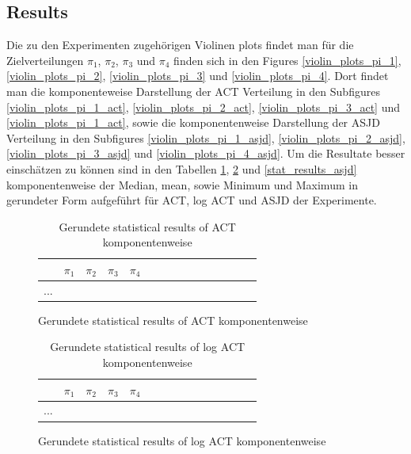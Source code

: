 \documentclass{scrartcl}
\begin{document}
    \subsection{Results}
    Die zu den Experimenten zugehörigen Violinen plots findet man für die Zielverteilungen $\pi_1$, $\pi_2$, $\pi_3$ und $\pi_4$ finden sich
    in den Figures \ref{violin_plots_pi_1}, \ref{violin_plots_pi_2}, \ref{violin_plots_pi_3} und \ref{violin_plots_pi_4}. Dort findet man
    die komponenteweise Darstellung der ACT Verteilung in den Subfigures \ref{violin_plots_pi_1_act}, \ref{violin_plots_pi_2_act}, \ref{violin_plots_pi_3_act} und \ref{violin_plots_pi_1_act}, sowie
    die komponentenweise Darstellung der ASJD Verteilung in den Subfigures \ref{violin_plots_pi_1_asjd}, \ref{violin_plots_pi_2_asjd}, \ref{violin_plots_pi_3_asjd} und \ref{violin_plots_pi_4_asjd}.
    Um die Resultate besser einschätzen zu können sind in den Tabellen \ref{stat_results_act}, \ref{stat_results_log_act} und \ref{stat_results_asjd} komponentenweise der Median, mean, sowie Minimum und Maximum in gerundeter Form
    aufgeführt für ACT, log ACT und ASJD der Experimente.

    \begin{figure}[H]
        \begin{table}[H]
            \centering
            \begin{tabular}{|l|l|l|l|l|l|l|l|l|l|l|l|l|l|l|}
                \hline & $\pi_1$ & $\pi_2$ & $\pi_3$ & $\pi_4$ \\ \hline
                ...
            \end{tabular}
            \caption{Gerundete statistical results of ACT komponentenweise}
            \label{stat_results_act}
        \end{table}
    \end{figure}

    \begin{figure}[H]
        \begin{table}[H]
            \centering
            \begin{tabular}{|l|l|l|l|l|l|l|l|l|l|l|l|l|l|l|}
                \hline & $\pi_1$ & $\pi_2$ & $\pi_3$ & $\pi_4$ \\ \hline
                ...
            \end{tabular}
            \caption{Gerundete statistical results of log ACT komponentenweise}
            \label{stat_results_log_act}
        \end{table}
    \end{figure}
\end{document}
